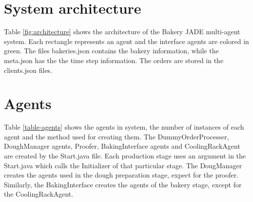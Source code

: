 \documentclass[paper=a4, fontsize=11pt]{scrartcl}
\begin{document}
		\section{System architecture}
		
		Table \ref{fig:architecture} shows the architecture of the Bakery JADE multi-agent system. Each rectangle represents an agent and the 
		interface agents are colored in green. The files bakeries.json contains the bakery information, while the meta.json has the the time step information. The orders are stored in the clients.json files. 



	\section{Agents}
	
		Table \ref{table-agents} shows the agents in system, the number of instances of each agent and the method used for creating them. The DummyOrderProcesser, DoughManager agents, Proofer, BakingInterface agents and CoolingRackAgent are created by the Start.java file. Each production stage uses an argument in the Start.java which calls the Initializer of that particular stage. The DougManager creates the agents used in the dough preparation stage, expect for the proofer. Similarly, the BakingInterface creates the agents of the bakery stage, except for the CoolingRackAgent. 
		
\end{document}
